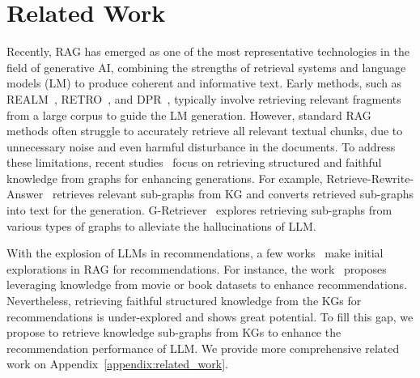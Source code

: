 \section{Related Work} 

Recently, RAG has emerged as one of the most representative technologies in the field of generative AI, combining the strengths of retrieval systems and language models (LM) to produce coherent and informative text.
Early methods, such as REALM~\citep{guu2020retrieval},  RETRO~\citep{borgeaud2022improving}, and DPR~\citep{karpukhin2020dense}, typically involve retrieving relevant fragments from a large corpus to guide the LM generation. 
However, standard RAG methods often struggle to accurately retrieve all relevant textual chunks, due to unnecessary noise and even harmful disturbance in the documents.
To address these limitations,  recent studies~\citep{baek2023knowledge,wu2023retrieve,he2024g,luo2023reasoning,wang2023knowledge,sen2023knowledge,sun2023think} focus on retrieving structured and faithful knowledge from graphs for enhancing generations. For example, Retrieve-Rewrite-Answer~\citep{wu2023retrieve} retrieves relevant sub-graphs from KG and converts retrieved sub-graphs into text for the generation.
G-Retriever~\citep{he2024g} explores retrieving sub-graphs from various types of graphs to alleviate the hallucinations of LLM.

With the explosion of LLMs in recommendations, a few works~\citep{di2023retrieval,wu2024coral,ang2024tsgassist} make initial explorations in RAG for recommendations.
For instance, the work~\citep{di2023retrieval} proposes
leveraging knowledge from movie or book datasets to enhance recommendations. 
Nevertheless, retrieving faithful structured knowledge from the KGs for recommendations is under-explored and shows great potential.
To fill this gap, we propose to retrieve knowledge sub-graphs from KGs to enhance the recommendation performance of LLM. We provide more comprehensive related work on Appendix~\ref{appendix:related_work}.
